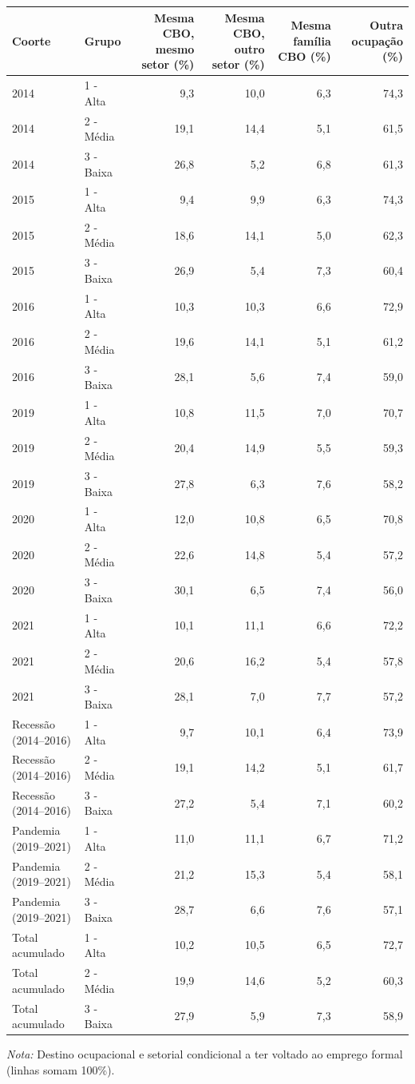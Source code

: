 \providecommand{\toprule}{\hline\hline}
\providecommand{\midrule}{\hline}
\providecommand{\bottomrule}{\hline\hline}
\providecommand{\addlinespace}[1][]{}
{\small
\renewcommand{\arraystretch}{1.12}
\begin{tabular}{llrrrr}
\toprule
Coorte & Grupo & Mesma CBO, mesmo setor (\%) & Mesma CBO, outro setor (\%) & Mesma família CBO (\%) & Outra ocupação (\%) \\
\midrule
2014 & 1 - Alta & 9,3 & 10,0 & 6,3 & 74,3 \\
2014 & 2 - Média & 19,1 & 14,4 & 5,1 & 61,5 \\
2014 & 3 - Baixa & 26,8 & 5,2 & 6,8 & 61,3 \\
\addlinespace[3pt]
2015 & 1 - Alta & 9,4 & 9,9 & 6,3 & 74,3 \\
2015 & 2 - Média & 18,6 & 14,1 & 5,0 & 62,3 \\
2015 & 3 - Baixa & 26,9 & 5,4 & 7,3 & 60,4 \\
\addlinespace[3pt]
2016 & 1 - Alta & 10,3 & 10,3 & 6,6 & 72,9 \\
2016 & 2 - Média & 19,6 & 14,1 & 5,1 & 61,2 \\
2016 & 3 - Baixa & 28,1 & 5,6 & 7,4 & 59,0 \\
\addlinespace[3pt]
2019 & 1 - Alta & 10,8 & 11,5 & 7,0 & 70,7 \\
2019 & 2 - Média & 20,4 & 14,9 & 5,5 & 59,3 \\
2019 & 3 - Baixa & 27,8 & 6,3 & 7,6 & 58,2 \\
\addlinespace[3pt]
2020 & 1 - Alta & 12,0 & 10,8 & 6,5 & 70,8 \\
2020 & 2 - Média & 22,6 & 14,8 & 5,4 & 57,2 \\
2020 & 3 - Baixa & 30,1 & 6,5 & 7,4 & 56,0 \\
\addlinespace[3pt]
2021 & 1 - Alta & 10,1 & 11,1 & 6,6 & 72,2 \\
2021 & 2 - Média & 20,6 & 16,2 & 5,4 & 57,8 \\
2021 & 3 - Baixa & 28,1 & 7,0 & 7,7 & 57,2 \\
\addlinespace[3pt]
Recessão (2014–2016) & 1 - Alta & 9,7 & 10,1 & 6,4 & 73,9 \\
Recessão (2014–2016) & 2 - Média & 19,1 & 14,2 & 5,1 & 61,7 \\
Recessão (2014–2016) & 3 - Baixa & 27,2 & 5,4 & 7,1 & 60,2 \\
\addlinespace[3pt]
Pandemia (2019–2021) & 1 - Alta & 11,0 & 11,1 & 6,7 & 71,2 \\
Pandemia (2019–2021) & 2 - Média & 21,2 & 15,3 & 5,4 & 58,1 \\
Pandemia (2019–2021) & 3 - Baixa & 28,7 & 6,6 & 7,6 & 57,1 \\
\addlinespace[3pt]
Total acumulado & 1 - Alta & 10,2 & 10,5 & 6,5 & 72,7 \\
Total acumulado & 2 - Média & 19,9 & 14,6 & 5,2 & 60,3 \\
Total acumulado & 3 - Baixa & 27,9 & 5,9 & 7,3 & 58,9 \\
\bottomrule
\end{tabular}
\vspace{2pt}
\par{\footnotesize \textit{Nota:} Destino ocupacional e setorial condicional a ter voltado ao emprego formal (linhas somam 100\%).}
}
